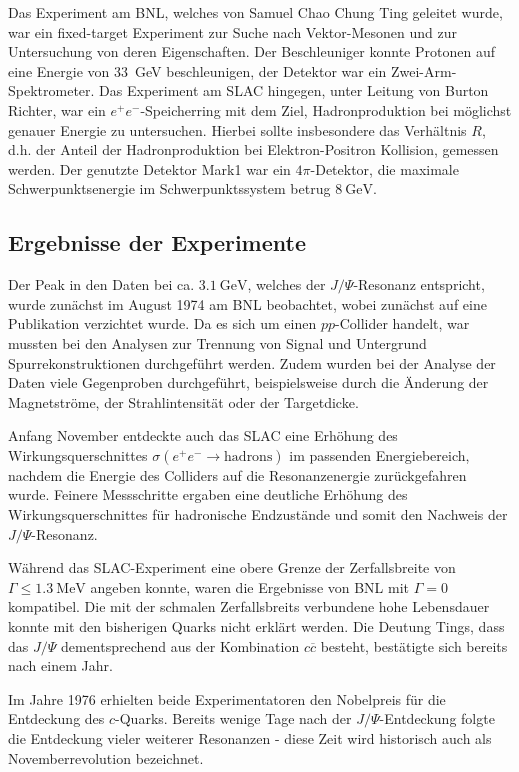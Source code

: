 Das Experiment am BNL, welches von Samuel Chao Chung Ting geleitet wurde, war ein fixed-target Experiment zur Suche nach Vektor-Mesonen und zur Untersuchung von deren Eigenschaften.
Der Beschleuniger konnte Protonen auf eine Energie von \SI{33}{\giga\electronvolt} beschleunigen, der Detektor war ein Zwei-Arm-Spektrometer.
Das Experiment am SLAC hingegen, unter Leitung von Burton Richter, war ein $e^+ e^-$-Speicherring mit dem Ziel, Hadronproduktion bei möglichst genauer Energie zu untersuchen.
Hierbei sollte insbesondere das Verhältnis $R$, d.h. der Anteil der Hadronproduktion bei Elektron-Positron Kollision, gemessen werden.
Der genutzte Detektor Mark1 war ein $4\pi$-Detektor, die maximale Schwerpunktsenergie im Schwerpunktssystem betrug $\SI{8}{\giga\electronvolt}$. 

\subsection{Ergebnisse der Experimente}

Der Peak in den Daten bei ca. $\SI{3.1}{\giga\electronvolt}$, welches der $J/\Psi$-Resonanz entspricht, wurde zunächst im August 1974 am BNL beobachtet, wobei zunächst auf eine Publikation verzichtet wurde.
Da es sich um einen $pp$-Collider handelt, war mussten bei den Analysen zur Trennung von Signal und Untergrund Spurrekonstruktionen durchgeführt werden.
Zudem wurden bei der Analyse der Daten  viele Gegenproben durchgeführt, beispielsweise durch die Änderung der Magnetströme, der Strahlintensität oder der Targetdicke.

Anfang November entdeckte auch das SLAC eine Erhöhung des Wirkungsquerschnittes $\sigma\left(e^+ e^- \to \text{hadrons}\right)$ im passenden Energiebereich, nachdem die Energie des Colliders auf die Resonanzenergie zurückgefahren wurde.
Feinere Messschritte ergaben eine deutliche Erhöhung des Wirkungsquerschnittes für hadronische Endzustände und somit den Nachweis der $J/\Psi$-Resonanz.

Während das SLAC-Experiment eine obere Grenze der Zerfallsbreite von $\Gamma \leq \SI{1.3}{\mega\electronvolt}$ angeben konnte, waren die Ergebnisse von BNL mit $\Gamma = 0$ kompatibel.
Die mit der schmalen Zerfallsbreits verbundene hohe Lebensdauer konnte mit den bisherigen Quarks nicht erklärt werden.
Die Deutung Tings, dass das $J/\Psi$ dementsprechend aus der Kombination $c\overline{c}$ besteht, bestätigte sich bereits nach einem Jahr.

Im Jahre 1976 erhielten beide Experimentatoren den Nobelpreis für die Entdeckung des $c$-Quarks.
Bereits wenige Tage nach der $J/\Psi$-Entdeckung folgte die Entdeckung vieler weiterer Resonanzen - diese Zeit wird historisch auch als Novemberrevolution bezeichnet.

